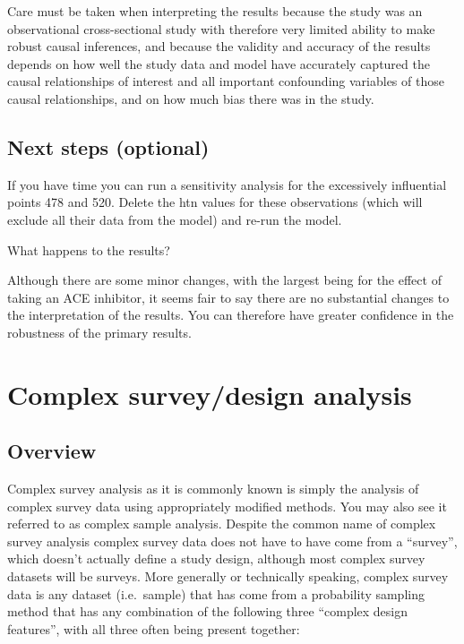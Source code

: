 \documentclass[
]{book}
\begin{document}
Care must be taken when interpreting the results because the study was an observational cross-sectional study with therefore very limited ability to make robust causal inferences, and because the validity and accuracy of the results depends on how well the study data and model have accurately captured the causal relationships of interest and all important confounding variables of those causal relationships, and on how much bias there was in the study.

\hypertarget{next-steps-optional-2}{%
\section{Next steps (optional)}\label{next-steps-optional-2}}

If you have time you can run a sensitivity analysis for the excessively influential points 478 and 520. Delete the htn values for these observations (which will exclude all their data from the model) and re-run the model.

What happens to the results?

Although there are some minor changes, with the largest being for the effect of taking an ACE inhibitor, it seems fair to say there are no substantial changes to the interpretation of the results. You can therefore have greater confidence in the robustness of the primary results.

\hypertarget{complex-surveydesign-analysis}{%
\chapter{Complex survey/design analysis}\label{complex-surveydesign-analysis}}

\hypertarget{overview-15}{%
\section{Overview}\label{overview-15}}

Complex survey analysis as it is commonly known is simply the analysis of complex survey data using appropriately modified methods. You may also see it referred to as complex sample analysis. Despite the common name of complex survey analysis complex survey data does not have to have come from a ``survey'', which doesn't actually define a study design, although most complex survey datasets will be surveys. More generally or technically speaking, complex survey data is any dataset (i.e.~sample) that has come from a probability sampling method that has any combination of the following three ``complex design features'', with all three often being present together:
\end{document}
